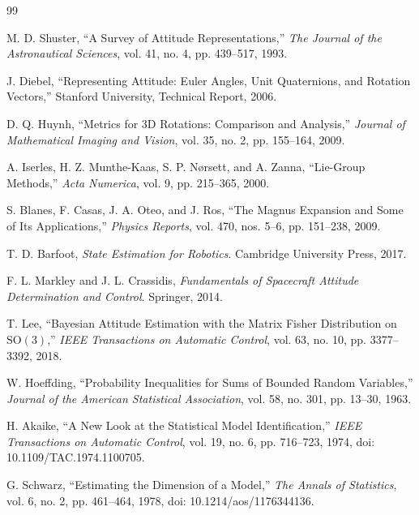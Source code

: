 \documentclass[11pt]{article}
\newcommand{\SO}{\mathrm{SO}(3)}
\begin{document}
    \begin{thebibliography}{99}

        M. D. Shuster,
        ``A Survey of Attitude Representations,''
        \emph{The Journal of the Astronautical Sciences},
        vol. 41, no. 4, pp. 439--517, 1993.

        J. Diebel,
        ``Representing Attitude: Euler Angles, Unit Quaternions, and Rotation Vectors,''
        Stanford University, Technical Report, 2006.

        D. Q. Huynh,
        ``Metrics for 3D Rotations: Comparison and Analysis,''
        \emph{Journal of Mathematical Imaging and Vision},
        vol. 35, no. 2, pp. 155--164, 2009.

        A. Iserles, H. Z. Munthe-Kaas, S. P. N\o rsett, and A. Zanna,
        ``Lie-Group Methods,''
        \emph{Acta Numerica}, vol. 9, pp. 215--365, 2000.

        S. Blanes, F. Casas, J. A. Oteo, and J. Ros,
        ``The Magnus Expansion and Some of Its Applications,''
        \emph{Physics Reports}, vol. 470, nos. 5--6, pp. 151--238, 2009.

        T. D. Barfoot,
        \emph{State Estimation for Robotics}.
        Cambridge University Press, 2017.

        F. L. Markley and J. L. Crassidis,
        \emph{Fundamentals of Spacecraft Attitude Determination and Control}.
        Springer, 2014.

        T. Lee,
        ``Bayesian Attitude Estimation with the Matrix Fisher Distribution on $\SO$,''
        \emph{IEEE Transactions on Automatic Control},
        vol. 63, no. 10, pp. 3377--3392, 2018.

        W. Hoeffding,
        ``Probability Inequalities for Sums of Bounded Random Variables,''
        \emph{Journal of the American Statistical Association},
        vol. 58, no. 301, pp. 13--30, 1963.

        H. Akaike,
        ``A New Look at the Statistical Model Identification,''
        \emph{IEEE Transactions on Automatic Control},
        vol. 19, no. 6, pp. 716--723, 1974,
        doi: 10.1109/TAC.1974.1100705.

        G. Schwarz,
        ``Estimating the Dimension of a Model,''
        \emph{The Annals of Statistics}, vol. 6, no. 2, pp. 461--464, 1978,
        doi: 10.1214/aos/1176344136.


\end{thebibliography}
\end{document}
